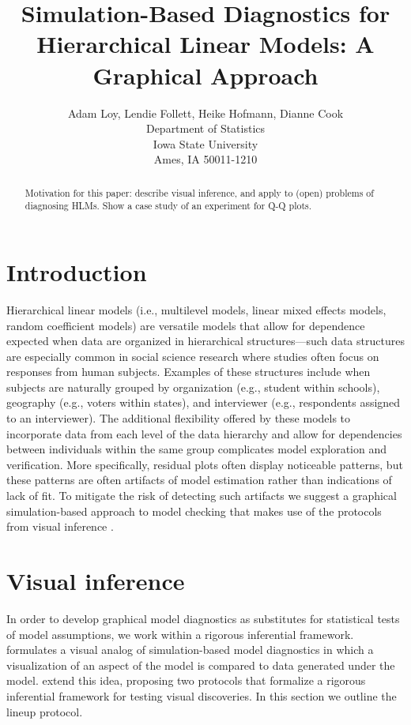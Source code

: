 \documentclass{article} %
\title{Simulation-Based Diagnostics for Hierarchical Linear Models: A Graphical Approach}
\author{Adam Loy, Lendie Follett, Heike Hofmann, Dianne Cook\\
	Department of Statistics\\
	Iowa State University\\
	Ames, IA 50011-1210
}
\begin{document}
\maketitle
\begin{abstract}
Motivation for this paper: describe visual inference, and apply to (open) problems of diagnosing HLMs. Show a case study of an experiment for Q-Q plots. 
\end{abstract}

\tableofcontents
\section{Introduction}

Hierarchical linear models (i.e., multilevel models, linear mixed effects models, random coefficient models) are versatile models that allow for dependence expected when data are organized in hierarchical structures---such data structures are especially common in social science research where studies often focus on responses from human subjects. Examples of these structures include when subjects are naturally grouped by organization (e.g., student within schools), geography (e.g., voters within states), and interviewer (e.g., respondents assigned to an interviewer). The additional flexibility offered by these models to incorporate data from each level of the data hierarchy and allow for dependencies between individuals within the same group complicates model exploration and verification. More specifically, residual plots often display noticeable patterns, but these patterns are often artifacts of model estimation rather than indications of lack of fit. To mitigate the risk of detecting such artifacts we suggest a graphical simulation-based approach to model checking that makes use of the protocols from visual inference \citep{Buja:2009hp}.


\section{Visual inference}\label{sec:vi}
In order to develop graphical model diagnostics as substitutes for statistical tests of model assumptions, we work within a rigorous inferential framework. \cite{Gelman:2004gg} formulates a visual analog of simulation-based model diagnostics in which a visualization of an aspect of the model is compared to data generated under the model. \cite{Buja:2009hp} extend this idea, proposing two protocols that formalize a rigorous inferential framework for testing visual discoveries. In this section we outline the lineup protocol.
\end{document}
